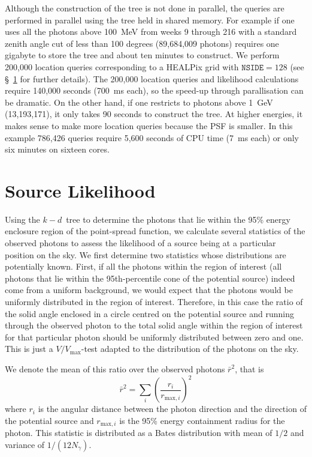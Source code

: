 \documentclass[useAMS,usenatbib]{mn2e}
\begin{document}
Although the construction of the tree is not done in parallel, the
queries are performed in parallel using the tree held in shared
memory.  For example if one uses all the photons above 100~MeV from
weeks 9 through 216 with a standard zenith angle cut of less than 100
degrees (89,684,009 photons) requires one gigabyte to store the tree
and about ten minutes to construct. We perform 200,000 location
queries corresponding to a HEALPix \citep{2005ApJ...622..759G} grid
with $\mathtt{NSIDE}=128$ (see \S~\ref{sec:source-likelihood} for
further details).  The 200,000 location queries and likelihood
calculations require 140,000 seconds (700~ms each), so the speed-up
through parallisation can be dramatic.  On the other hand, if one
restricts to photons above 1~GeV (13,193,171), it only takes 90
seconds to construct the tree.  At higher energies, it makes sense to
make more location queries because the PSF is smaller.  In this
example 786,426 queries require 5,600 seconds of CPU time (7~ms each)
or only six minutes on sixteen cores.

\section{Source Likelihood}
\label{sec:source-likelihood}

Using the $k-d$~tree to determine the photons that lie within the 95\%
energy enclosure region of the point-spread function, we calculate
several statistics of the observed photons to assess the likelihood of
a source being at a particular position on the sky.  We first
determine two statistics whose distributions are potentially
known. First, if all the photons within the region of interest (all
photons that lie within the 95th-percentile cone of the potential
source) indeed come from a uniform background, we would expect that
the photons would be uniformly distributed in the region of interest.
Therefore, in this case the ratio of the solid angle enclosed in a
circle centred on the potential source and running through the
observed photon to the total solid angle within the region of interest
for that particular photon should be uniformly distributed between
zero and one. This is just a $V/V_\mathrm{max}$-test
\citep{1968ApJ...151..393S} adapted to the distribution of the photons
on the sky.

We denote the mean of this ratio over the
observed photons $\bar r^2$, that is
\begin{equation}
  \bar r^2 = \sum_i \left ( \frac{r_i}{r_{\mathrm{max},i}} \right )^2 
\end{equation}
where $r_i$ is the angular distance between the photon direction and
the direction of the potential source and $r_{\mathrm{max},i}$ is the
95\% energy containment radius for the photon.  This statistic is
distributed as a Bates distribution with mean of $1/2$ and variance of
$1/(12 N_\gamma)$.  
\end{document}

